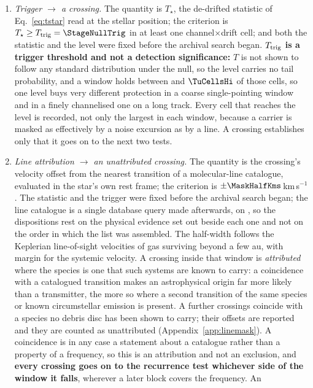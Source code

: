 \begin{enumerate}[label=(\roman*),leftmargin=1.9em,itemsep=3pt,topsep=3pt,parsep=0pt]
\item \emph{Trigger $\to$ a crossing.} The quantity is $T_\star$, the
de-drifted statistic of Eq.~\ref{eq:tstar} read at the stellar position; the
criterion is $T_\star\geq T_{\rm trig}=\StageNullTrig$ in at least one
channel$\times$drift cell; and both the statistic and the level were fixed
before the archival search began. \textbf{$T_{\rm trig}$ is a trigger
threshold and not a detection significance:} $T$ is not shown to follow any
standard distribution under the null, so the level carries no tail
probability, and a window holds between \TuCellsLo{} and $\TuCellsHi$ of
those cells, so one level buys very different protection in a coarse
single-pointing window and in a finely channelised one on a long track. Every
cell that reaches the level is recorded, not only the largest in each window,
because a carrier is masked as effectively by a noise excursion as by a line.
A crossing establishes only that it goes on to the next two tests.
\item \emph{Line attribution $\to$ an unattributed crossing.} The quantity
is the crossing's velocity offset from the nearest transition of a
molecular-line catalogue, evaluated in the star's own rest frame; the
criterion is $\pm\MaskHalfKms$\,km\,s$^{-1}$. The statistic and the trigger
were fixed before the archival search began; the line catalogue is a single
database query made afterwards, on \MkListDate, so the dispositions rest on
the physical evidence set out beside each one and not on the order in which
the list was assembled. The half-width follows the Keplerian line-of-sight
velocities of gas
surviving beyond a few au, with margin for the systemic velocity. A crossing
inside that window is \emph{attributed} where the species is one that such
systems are known to carry: a coincidence with a catalogued transition makes
an astrophysical origin far more likely than a transmitter, the more so
where a second transition of the same species or known circumstellar
emission is present. A further \MkNSODecideWord{} crossings coincide with a
species no debris disc has been shown to carry; their offsets are reported
and they are counted as unattributed (Appendix~\ref{app:linemask}).
A coincidence is in any case a statement about a catalogue rather than a
property of a frequency, so this is an attribution and not an exclusion, and
\textbf{every crossing goes on to the recurrence test whichever side of the
window it falls}, wherever a later block covers the frequency. An

\end{enumerate}
